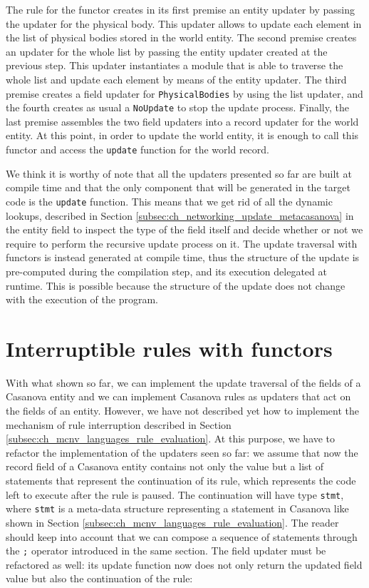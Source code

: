 \noindent
The rule for the functor creates in its first premise an entity updater by passing the updater for the physical body. This updater allows to update each element in the list of physical bodies stored in the world entity. The second premise creates an updater for the whole list by passing the entity updater created at the previous step. This updater instantiates a module that is able to traverse the whole list and update each element by means of the entity updater. The third premise creates a field updater for \texttt{PhysicalBodies} by using the list updater, and the fourth creates as usual a \texttt{NoUpdate} to stop the update process. Finally, the last premise assembles the two field updaters into a record updater for the world entity. At this point, in order to update the world entity, it is enough to call this functor and access the \texttt{update} function for the world record.

We think it is worthy of note that all the updaters presented so far are built at compile time and that the only component that will be generated in the target code is the \texttt{update} function. This means that we get rid of all the dynamic lookups, described in Section \ref{subsec:ch_networking_update_metacasanova} in the entity field to inspect the type of the field itself and decide whether or not we require to perform the recursive update process on it. The update traversal with functors is instead generated at compile time, thus the structure of the update is pre-computed during the compilation step, and its execution delegated at runtime. This is possible because the structure of the update does not change with the execution of the program.

\section{Interruptible rules with functors}
\label{subsec:ch_networking_interruptible_rules}
With what shown so far, we can implement the update traversal of the fields of a Casanova entity and we can implement Casanova rules as updaters that act on the fields of an entity. However, we have not described yet how to implement the mechanism of rule interruption described in Section \ref{subsec:ch_mcnv_languages_rule_evaluation}. At this purpose, we have to refactor the implementation of the updaters seen so far: we assume that now the record field of a Casanova entity contains not only the value but a list of statements that represent the continuation of its rule, which represents the code left to execute after the rule is paused. The continuation will have type \texttt{stmt}, where \texttt{stmt} is a meta-data structure representing a statement in Casanova like shown in Section \ref{subsec:ch_mcnv_languages_rule_evaluation}. The reader should keep into account that we can compose a sequence of statements through the \texttt{;} operator introduced in the same section. The field updater must be refactored as well: its update function now does not only return the updated field value but also the continuation of the rule:

